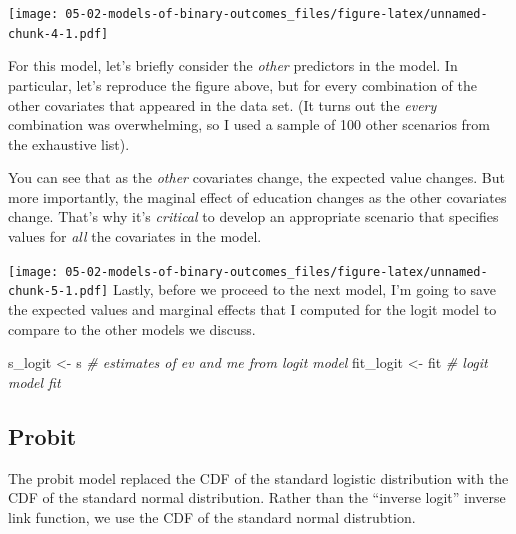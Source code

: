 \documentclass[
]{book}
\newenvironment{Shaded}{\begin{snugshade}}{\end{snugshade}}
\newcommand{\CommentTok}[1]{\textcolor[rgb]{0.56,0.35,0.01}{\textit{#1}}}
\newcommand{\NormalTok}[1]{#1}
\newcommand{\OtherTok}[1]{\textcolor[rgb]{0.56,0.35,0.01}{#1}}
\begin{document}
\texttt{[image: 05-02-models-of-binary-outcomes\_files/figure-latex/unnamed-chunk-4-1.pdf]}

For this model, let's briefly consider the \emph{other} predictors in the model. In particular, let's reproduce the figure above, but for every combination of the other covariates that appeared in the data set. (It turns out the \emph{every} combination was overwhelming, so I used a sample of 100 other scenarios from the exhaustive list).

You can see that as the \emph{other} covariates change, the expected value changes. But more importantly, the maginal effect of education changes as the other covariates change. That's why it's \emph{critical} to develop an appropriate scenario that specifies values for \emph{all} the covariates in the model.

\texttt{[image: 05-02-models-of-binary-outcomes\_files/figure-latex/unnamed-chunk-5-1.pdf]}
Lastly, before we proceed to the next model, I'm going to save the expected values and marginal effects that I computed for the logit model to compare to the other models we discuss.

\begin{Shaded}
\begin{Highlighting}[]
\NormalTok{s\_logit }\OtherTok{\textless{}{-}}\NormalTok{ s     }\CommentTok{\# estimates of ev and me from logit model}
\NormalTok{fit\_logit }\OtherTok{\textless{}{-}}\NormalTok{ fit }\CommentTok{\# logit model fit}
\end{Highlighting}
\end{Shaded}

\hypertarget{probit}{%
\subsection{Probit}\label{probit}}

The probit model replaced the CDF of the standard logistic distribution with the CDF of the standard normal distribution. Rather than the ``inverse logit'' inverse link function, we use the CDF of the standard normal distrubtion.
\end{document}
